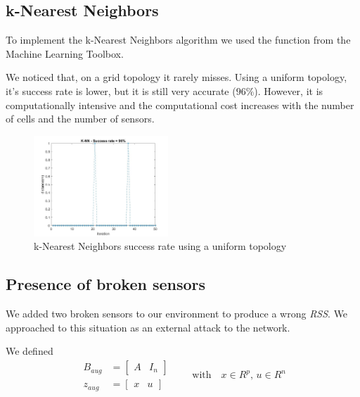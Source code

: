 \subsection{k-Nearest Neighbors}

To implement the k-Nearest Neighbors algorithm we used the function  from the Machine Learning Toolbox. 

We noticed that, on a grid topology it rarely misses. Using a uniform topology, it's success rate is lower, but it is still very accurate ($96\%$). 
However, it is computationally intensive and the computational cost increases with the number of cells and the number of sensors.

\begin{figure}[H]
    \centering
    \includegraphics[width=0.45\textwidth]{img/extension_2_knn.jpg}
    \caption{k-Nearest Neighbors success rate using a uniform topology}
\end{figure}

\addtocounter{subsection}{1}

\subsection{Presence of broken sensors}
We added two broken sensors to our environment to produce a wrong \emph{RSS}. We approached to this situation as an external 
attack to the network.

We defined 
\begin{equation*}
\begin{aligned}
    B_{aug}&=\begin{bmatrix}
        A & I_n
    \end{bmatrix}\\
    z_{aug}&=\begin{bmatrix}
        x & u
    \end{bmatrix}
\end{aligned}
\quad\quad\text{with}\quad
x\in R^p,\, u\in R^n
\end{equation*}

